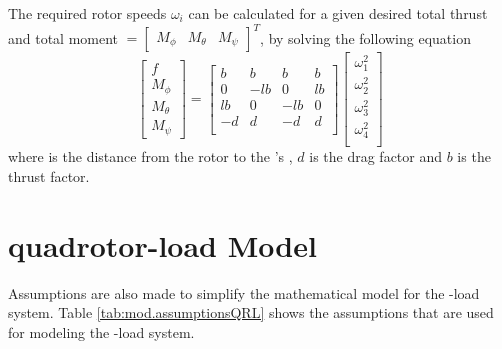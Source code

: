 The required rotor speeds $ \omega_i $ can be calculated for a given desired total thrust  and total moment $=\begin{bmatrix}	M_\phi&M_\theta&M_\psi	\end{bmatrix}^T  $, by solving the following equation
\begin{equation}\label{eq:omega_i}
\begin{bmatrix}
f\\M_\phi\\M_\theta\\M_\psi
\end{bmatrix}=
\begin{bmatrix}
b&b&b&b\\
0&-lb&0&lb\\
lb&0&-lb&0\\
-d&d&-d&d\\
\end{bmatrix}
\begin{bmatrix}
\omega_1^2\\
\omega_2^2\\
\omega_3^2\\
\omega_4^2\\
\end{bmatrix}
\end{equation}
where  is the distance from the rotor to the 's , $ d $ is the drag factor and $ b $ is the thrust factor. 
 
\newpage
\section{quadrotor-load Model}	\label{sec:mod.QRLmod}

Assumptions are also made to simplify the mathematical model for the -load system.
Table \ref{tab:mod.assumptionsQRL} shows the assumptions that are used for modeling the -load system. 

